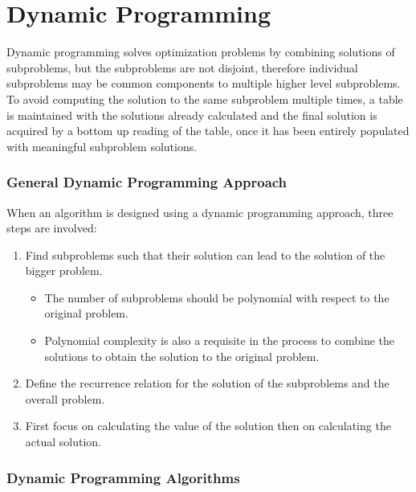 \documentclass[12pt,letterpaper]{article}
\begin{document}
\part{Dynamic Programming}
Dynamic programming solves optimization problems by combining solutions of subproblems, but the subproblems are not disjoint, therefore individual subproblems may be common components to multiple higher level subproblems. To avoid computing the solution to the same subproblem multiple times, a table is maintained with the solutions already calculated and the final solution is acquired by a bottom up reading of the table, once it has been entirely populated with meaningful subproblem solutions. 
\section{General Dynamic Programming Approach}
When an algorithm is designed using a dynamic programming approach, three steps are involved:
\begin{enumerate}
\item Find subproblems such that their solution can lead to the solution of the bigger problem.
\begin{itemize}
\item The number of subproblems should be polynomial with respect to the original problem.
\item Polynomial complexity is also a requisite in the process to combine the solutions to obtain the solution to the original problem.
\end{itemize}
\item Define the recurrence relation for the solution of the subproblems and the overall problem.
\item First focus on calculating the value of the solution then on calculating the actual solution.
\end{enumerate}
\section{Dynamic Programming Algorithms}
\end{document}
